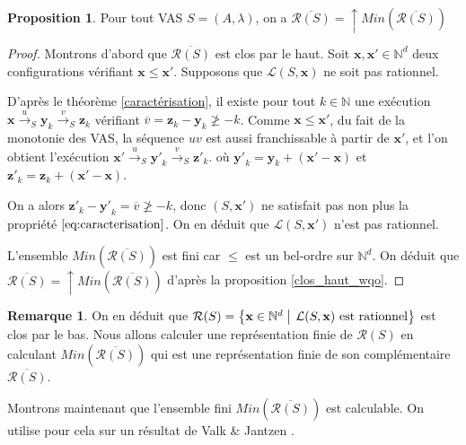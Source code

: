 \documentclass[a4paper,final]{article}
\theoremstyle{definition}
\newtheorem{Proposition}[Theorem]{Proposition}
\newtheorem*{Remark}{Remarque}
\let\leq\leqslant
\let\geq\geqslant
\newcommand{\alain}[1]{\textcolor{blue}{#1}}
\newcommand{\lucas}[1]{\textcolor{olive}{#1}}
\newcommand{\set}[2]{\left\{#1\mathrel{\left|\vphantom{#1}\vphantom{#2}\right.}#2\right\}}
\newcommand{\Min}{\textit{Min}}
\newcommand{\N}{\ensuremath{\mathbb{N}}}
\newcommand{\lang}{\ensuremath{\mathcal{L}}}
\newcommand{\trans}[2]{\ensuremath{\stackrel{#1}{\longrightarrow}_{#2}}}
\newcommand{\vect}[1]{\ensuremath{\mathbf{#1}}}
\newcommand{\valeur}[1]{\ensuremath{\overline{#1}}}
\newcommand{\inirat}{\mathcal{R}}
\begin{document}
\begin{Proposition}\label{monotonie_rationnel}
Pour tout VAS $S = (A,\lambda)$, on a
 $\overline{\inirat(S)} = \uparrow \Min(\overline{\inirat(S)})$ 
\end{Proposition}


\begin{proof}
Montrons d'abord que $\overline{\inirat(S)}$ est clos par le haut. Soit $\vect{x},\vect{x'}\in\N^d$ deux configurations vérifiant $\vect{x} \leq \vect{x'}$.
Supposons que $\lang(S,\vect{x})$ ne soit pas rationnel.

D'après le théorème \ref{caractérisation}, il existe pour tout $k\in\N$ une exécution $\vect{x} \trans{u}{S} \vect{y}_k \trans{v}{S} \vect{z}_k$ vérifiant $\valeur{v} = \vect{z}_k - \vect{y}_k \not\geq -k$.
Comme $\vect{x}\leq\vect{x'}$, du fait de la monotonie des VAS, la séquence $uv$ est aussi franchissable à partir de $\vect{x'}$, et l'on obtient l'exécution $\vect{x'} \trans{u}{S} \vect{y'}_k \trans{v}{S} \vect{z'}_k$.
où $\vect{y'}_k = \vect{y}_k + (\vect{x'} - \vect{x})$ et $\vect{z'}_k = \vect{z}_k + (\vect{x'} - \vect{x})$.

On a alors $\vect{z'}_k - \vect{y'}_k = \valeur{v} \not\geq -k$, donc $(S,\vect{x'})$ ne satisfait pas non plus la propriété $\eqref{eq:caracterisation}$.
On en déduit que $\lang(S,\vect{x'})$ n'est pas rationnel.

L'ensemble $\Min(\overline{\inirat(S)})$ est fini car $\leq$ est un bel-ordre sur $\N^d$. On déduit que $\overline{\inirat(S)}=\uparrow \Min(\overline{\inirat(S)})$ d'après la proposition \ref{clos_haut_wqo}.
\end{proof}

\begin{Remark}
On en déduit que $\inirat(S) = \set{\vect{x} \in \N^d} {\lang(S,\vect{x}) \text{ est rationnel}}$ est clos par le bas. Nous allons calculer une représentation finie de $\inirat(S)$ en calculant $\Min(\overline{\inirat(S)})$ qui est une représentation finie de son complémentaire $\overline{\inirat(S)}$.
\end{Remark}

Montrons maintenant que l'ensemble fini $\Min(\overline{\inirat(S)})$ est calculable.
On utilise pour cela sur un résultat de Valk \& Jantzen \cite{vaja85}.
\end{document}
